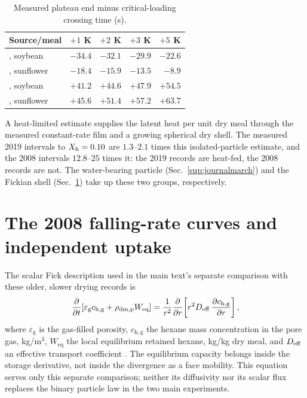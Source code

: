 \documentclass[11pt]{article}
\newcommand{\Cdm}{\rho_{\mathrm{dm,p}}}
\begin{document}
\begin{table}[htbp]\centering\footnotesize
\caption{Measured plateau end minus critical-loading crossing time (s).}\label{tab:sub:criterion}
\begin{tabular}{@{}lrrrr@{}}\toprule
Source/meal & $+1$ K & $+2$ K & $+3$ K & $+5$ K\\\midrule
\citet{faner2008desolventizado}, soybean & $-34.4$ & $-32.1$ & $-29.9$ & $-22.6$\\
\citet{faner2008desolventizado}, sunflower & $-18.4$ & $-15.9$ & $-13.5$ & $-8.9$\\
\citet{faner2019kinetics}, soybean & $+41.2$ & $+44.6$ & $+47.9$ & $+54.5$\\
\citet{faner2019kinetics}, sunflower & $+45.6$ & $+51.4$ & $+57.2$ & $+63.7$\\
\bottomrule\end{tabular}\end{table}

A heat-limited estimate supplies the latent heat per unit dry meal through the measured constant-rate film and a growing spherical dry shell. The measured 2019 intervals to $X_{\mathrm{h}}=0.10$ are $1.3$--$2.1$ times this isolated-particle estimate, and the 2008 intervals $12.8$--$25$ times it: the 2019 records are heat-fed, the 2008 records are not. The water-bearing particle (Sec.~\ref{sup:journalmarch}) and the Fickian shell (Sec.~\ref{sup:surfaceloading}) take up these two groups, respectively.

\section{The 2008 falling-rate curves and independent uptake}
\label{sup:surfaceloading}\label{sup:item27}\label{sup:item29}\label{sup:item31}\label{sup:item32}\label{sup:moved:uptake}
The scalar Fick description used in the main text's separate comparison with these older, slower drying records is
\begin{equation}
\frac{\partial}{\partial t}\!\left[\varepsilon_{\mathrm{g}} c_{\mathrm{h,g}}
 + \Cdm W_{\mathrm{eq}}\right]
 = \frac{1}{r^{2}}\frac{\partial}{\partial r}
   \!\left[r^{2}\Deff\,\frac{\partial c_{\mathrm{h,g}}}{\partial r}\right],
\label{eq:ficklimit}
\end{equation}
where $\varepsilon_{\mathrm g}$ is the gas-filled porosity,
$c_{\mathrm{h,g}}$ the hexane mass concentration in the pore gas, kg/m$^3$,
$W_{\mathrm{eq}}$ the local equilibrium retained hexane, kg/kg dry meal,
and $D_{\mathrm{eff}}$ an effective transport coefficient
\citep{cardarelli2002modeling}. The equilibrium capacity belongs inside the
storage derivative, not inside the divergence as a face mobility.
This equation serves only this separate comparison; neither its diffusivity
nor its scalar flux replaces the binary particle law in the two main
experiments.
\end{document}
